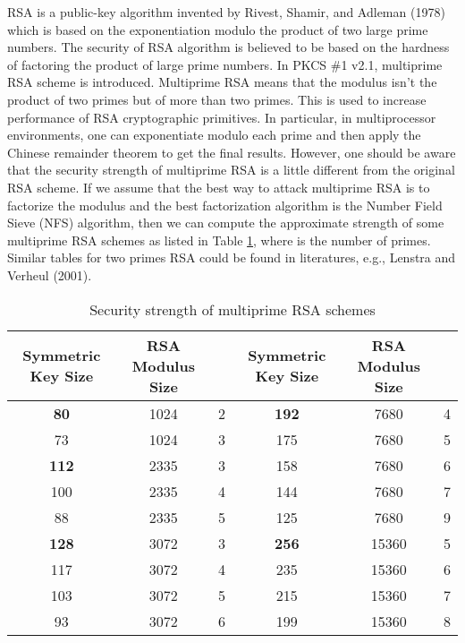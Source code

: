 \documentclass{article}
\begin{document}
RSA is a public-key algorithm invented by Rivest, Shamir, and Adleman (1978)
which is based on the exponentiation modulo the 
product of two large prime numbers. The security of RSA algorithm 
is believed to be based on the hardness of factoring the product of 
large prime numbers. In PKCS \#1 v2.1, multiprime RSA scheme is introduced. 
Multiprime RSA means that the modulus isn't
the product of two primes but of more than two primes.
This is used to increase performance of RSA cryptographic primitives.
In particular, in multiprocessor environments, one can
exponentiate modulo each prime and then apply the Chinese remainder theorem 
to get the final results. However, one should be aware that the security
strength of multiprime RSA is a little different from the original
RSA scheme. If we assume that the best way to attack multiprime RSA is to 
factorize the modulus and the best factorization algorithm is
the Number Field Sieve (NFS) algorithm, then we can compute 
the approximate strength of some multiprime RSA schemes as listed in 
Table \ref{stable}, where  is the number of primes.
Similar tables for two primes RSA could be found in literatures,
e.g., Lenstra and Verheul (2001).
\begin{center}
\begin{table}[htb]
\caption{Security strength of multiprime RSA schemes}
\label{stable}
\begin{center}
\begin{tabular}{|c|c|c||c|c|c|} \hline
Symmetric Key Size & RSA Modulus Size & &Symmetric Key Size& RSA 
Modulus Size &  \\ \hline
{\bf 80} & 1024 & 2 & {\bf 192} & 7680 & 4   \\ \hline
73 & 1024 & 3 & 175 & 7680 & 5 \\ \hline
{\bf 112} & 2335 & 3 &158 & 7680 & 6 \\ \hline
100 & 2335 & 4& 144 & 7680 & 7\\ \hline
88 & 2335 & 5& 125 & 7680 & 9\\ \hline
{\bf 128} & 3072 & 3& {\bf 256} & 15360 & 5\\ \hline
117 & 3072 & 4&235 & 15360 & 6\\ \hline
103 & 3072 & 5& 215 & 15360 & 7\\ \hline
93 & 3072 & 6& 199 & 15360 & 8\\ \hline
\end{tabular}
\end{center}
\end{table}
\end{center}
\end{document}

